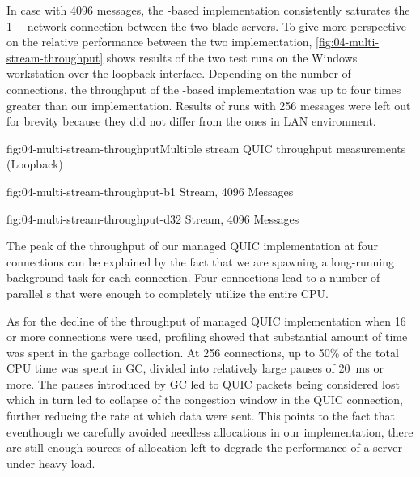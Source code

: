 In case with \SI{4096}{\byte} messages, the \libmsquic{}-based implementation consistently saturates
the \SI{1}{\giga\bit} network connection between the two blade servers. To give more perspective on
the relative performance between the two implementation, \autoref{fig:04-multi-stream-throughput}
shows results of the two test runs on the Windows workstation over the loopback interface. Depending
on the number of connections, the throughput of the \libmsquic{}-based implementation was up to four
times greater than our implementation. Results of runs with \SI{256}{\byte} messages were left out
for brevity because they did not differ from the ones in LAN environment.

\begin{myFigure}{fig:04-multi-stream-throughput}{Multiple stream QUIC throughput measurements (Loopback)}
\begin{mySubfigure}{0.49\linewidth}{fig:04-multi-stream-throughput-b}{1 Stream, \SI{4096}{\byte} Messages}
\footnotesize

\end{mySubfigure}
\begin{mySubfigure}{0.49\linewidth}{fig:04-multi-stream-throughput-d}{32 Stream, \SI{4096}{\byte} Messages}
\footnotesize

\end{mySubfigure}
\end{myFigure}

The peak of the throughput of our managed QUIC implementation at four connections can be explained
by the fact that we are spawning a long-running background task for each connection. Four
connections lead to a number of parallel s that were enough to completely utilize the
entire CPU\@.

As for the decline of the throughput of managed QUIC implementation when 16 or more connections were
used, profiling showed that substantial amount of time was spent in the garbage collection. At 256
connections, up to 50\% of the total CPU time was spent in GC, divided into relatively large pauses
of \SI{20}{\milli\second} or more. The pauses introduced by GC led to QUIC packets being considered
lost which in turn led to collapse of the congestion window in the QUIC connection, further reducing
the rate at which data were sent. This points to the fact that eventhough we carefully avoided
needless allocations in our implementation, there are still enough sources of allocation left to
degrade the performance of a server under heavy load.

